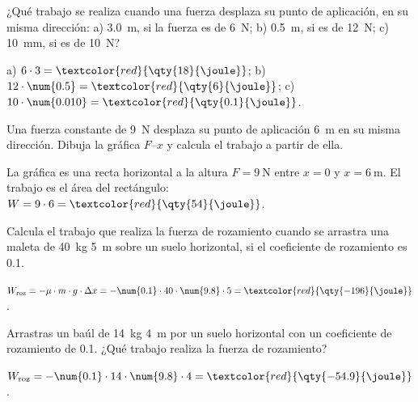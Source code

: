 \begin{exercise}
    ¿Qué trabajo se realiza cuando una fuerza desplaza su punto de aplicación, en su misma dirección: a) \qty{3.0}{\m}, si la fuerza es de \qty{6}{\newton}; b) \qty{0.5}{\m}, si es de \qty{12}{\newton}; c) \qty{10}{\mm}, si es de \qty{10}{\newton}?
    \begin{solu}
        a) \(6 \cdot 3 = \textcolor{red}{\qty{18}{\joule}}\); b) \(12 \cdot \num{0.5} = \textcolor{red}{\qty{6}{\joule}}\); c) \(10 \cdot \num{0.010} = \textcolor{red}{\qty{0.1}{\joule}}\).
    \end{solu}
\end{exercise}

\begin{exercise}
    Una fuerza constante de \qty{9}{\newton} desplaza su punto de aplicación \qty{6}{\m} en su misma dirección. Dibuja la gráfica \(F\)--\(x\) y calcula el trabajo a partir de ella.
    \begin{solu}
        La gráfica es una recta horizontal a la altura \(F = \qty{9}{\newton}\) entre \(x = 0\) y \(x = \qty{6}{\m}\). El trabajo es el área del rectángulo: \(W = 9 \cdot 6 = \textcolor{red}{\qty{54}{\joule}}\).
    \end{solu}
\end{exercise}

\begin{exercise}
    Calcula el trabajo que realiza la fuerza de rozamiento cuando se arrastra una maleta de \qty{40}{\kg} \qty{5}{\m} sobre un suelo horizontal, si el coeficiente de rozamiento es \num{0.1}.
    \begin{solu}
        \(W_{\text{roz}} = -\mu \cdot m \cdot g \cdot \Delta x = -\num{0.1} \cdot 40 \cdot \num{9.8} \cdot 5 = \textcolor{red}{\qty{-196}{\joule}}\).
    \end{solu}
\end{exercise}

\begin{exercise}
    Arrastras un baúl de \qty{14}{\kg} \qty{4}{\m} por un suelo horizontal con un coeficiente de rozamiento de \num{0.1}. ¿Qué trabajo realiza la fuerza de rozamiento?
    \begin{solu}
        \(W_{\text{roz}} = -\num{0.1} \cdot 14 \cdot \num{9.8} \cdot 4 = \textcolor{red}{\qty{-54.9}{\joule}}\).
    \end{solu}
\end{exercise}

